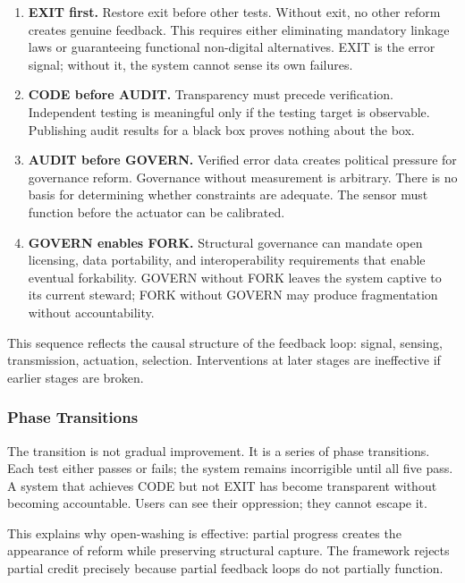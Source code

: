 \begin{enumerate}
    \item \textbf{EXIT first.} Restore exit before other tests. Without exit, no other reform creates genuine feedback. This requires either eliminating mandatory linkage laws or guaranteeing functional non-digital alternatives. EXIT is the error signal; without it, the system cannot sense its own failures.

    \item \textbf{CODE before AUDIT.} Transparency must precede verification. Independent testing is meaningful only if the testing target is observable. Publishing audit results for a black box proves nothing about the box.

    \item \textbf{AUDIT before GOVERN.} Verified error data creates political pressure for governance reform. Governance without measurement is arbitrary. There is no basis for determining whether constraints are adequate. The sensor must function before the actuator can be calibrated.

    \item \textbf{GOVERN enables FORK.} Structural governance can mandate open licensing, data portability, and interoperability requirements that enable eventual forkability. GOVERN without FORK leaves the system captive to its current steward; FORK without GOVERN may produce fragmentation without accountability.
\end{enumerate}

This sequence reflects the causal structure of the feedback loop: signal, sensing, transmission, actuation, selection. Interventions at later stages are ineffective if earlier stages are broken.

\subsubsection{Phase Transitions}

The transition is not gradual improvement. It is a series of phase transitions. Each test either passes or fails; the system remains incorrigible until all five pass. A system that achieves CODE but not EXIT has become transparent without becoming accountable. Users can see their oppression; they cannot escape it.

This explains why open-washing is effective: partial progress creates the appearance of reform while preserving structural capture. The framework rejects partial credit precisely because partial feedback loops do not partially function.


